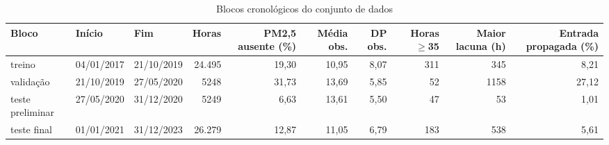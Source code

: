 \begin{table}[!htbp]
    \centering
    \caption{Blocos cronológicos do conjunto de dados}
    \label{tab:splits}
    \small
    \begin{adjustbox}{max width=\textwidth}
    \begin{tabular}{lllrrrrrrr}
        \toprule
        Bloco & Início & Fim & Horas & PM2,5 ausente (\%) & Média obs. & DP obs. & Horas $\geq$35 & Maior lacuna (h) & Entrada propagada (\%) \\
        \midrule
        treino & 04/01/2017 & 21/10/2019 & 24.495 & 19,30 & 10,95 & 8,07 & 311 & 345 & 8,21 \\
        validação & 21/10/2019 & 27/05/2020 & 5248 & 31,73 & 13,69 & 5,85 & 52 & 1158 & 27,12 \\
        teste preliminar & 27/05/2020 & 31/12/2020 & 5249 & 6,63 & 13,61 & 5,50 & 47 & 53 & 1,01 \\
        teste final & 01/01/2021 & 31/12/2023 & 26.279 & 12,87 & 11,05 & 6,79 & 183 & 538 & 5,61 \\
        \bottomrule
    \end{tabular}
    \end{adjustbox}
\end{table}
